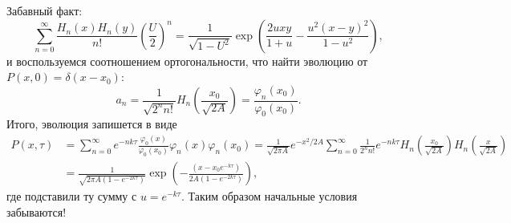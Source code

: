 Забавный факт:
\begin{equation*}
	\sum_{n=0}^{\infty} \frac{H_n(x) H_n(y)}{n!} \left(\frac{U}{2}\right)^n = \frac{1}{\sqrt{1-U^2}} \exp\left(
		\frac{2 u xy}{1+u} - \frac{u^2 (x-y)^2}{1-u^2}
	\right),
\end{equation*}
и воспользуемся соотношением ортогональности, что найти эволюцию от $P(x, 0) = \delta(x-x_0)$:
\begin{equation*}
	a_n = \frac{1}{\sqrt{2^n n!}} H_n\left(\frac{x_0}{\sqrt{2A}}\right) = \frac{\varphi_n(x_0)}{\varphi_0(x_0)}.
\end{equation*}
Итого, эволюция запишется в виде
\begin{align*}
	P(x, \tau) &= \sum_{n=0}^{\infty} e^{-n k \tau} \frac{\varphi_0(x)}{\varphi_0(x_0)} \varphi_n(x) \varphi_n(x_0)
	= \frac{1}{\sqrt{2\pi A}} e^{-x^2/2A} \sum_{n=0}^{\infty} \frac{1}{2^n n!} e^{-n k \tau} H_n\left(\frac{x_0}{\sqrt{2A}}\right) H_n \left(\frac{x}{\sqrt{2A}}\right) \\ 
	&= \frac{1}{\sqrt{2\pi A(1-e^{-2k \tau})}} \exp\left(
		- \frac{(x-x_0 e^{- k \tau})}{2A(1-e^{-2 k \tau})}
	\right),
\end{align*}
где подставили ту сумму с $u = e^{- k \tau}$. Таким образом начальные условия забываются!



